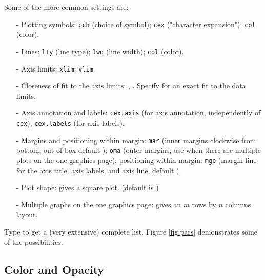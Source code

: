 Some of the more common settings are:\\[-3pt]
\begin{itemize}
\item[-] Plotting symbols: \verb+pch+ (choice of symbol); \verb+cex+
  ("character expansion"); \verb+col+
  (color).
\item[-] Lines: \verb+lty+ (line type); \verb+lwd+ (line width); \verb+col+
(color).
\item[-] Axis limits: \verb!xlim!; \verb!ylim!.
\item[-] Closeness of fit to the axis limits: ,
  . Specify
   for an exact fit to the data limits.
\item[-] Axis annotation and labels: \verb+cex.axis+ (for axis
  annotation, independently of \verb+cex+);
  \verb+cex.labels+ (for axis labels).
\item[-] Margins and positioning within
  margin:  \verb+mar+ (inner margins
  clockwise from bottom, out of box default ); \verb+oma+ (outer margins, use when there are multiple
  plots on the one graphics page); positioning within margin:
  \verb+mgp+ (margin line for the axis title, axis labels, and axis
  line, default ).
 \item[-] Plot shape:  gives a square
plot.
(default is )
\item[-] Multiple graphs on the one graphics page:  
  gives an $m$
  rows by $n$ columns layout.
\end{itemize}
Type  to get a (very extensive) complete list.  Figure
\ref{fig:pars} demonstrates some of the possibilities.

\subsection{Color and Opacity}

